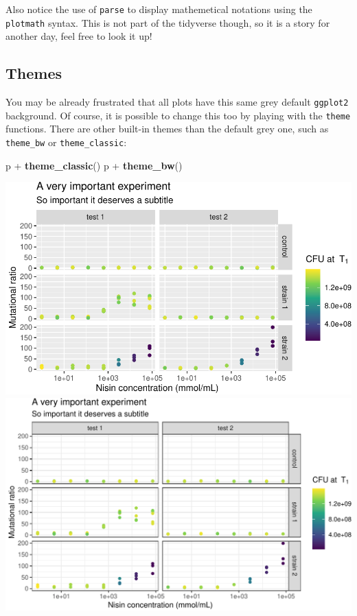 \documentclass[]{book}
\newenvironment{Shaded}{}{}
\newcommand{\KeywordTok}[1]{\textcolor[rgb]{0.00,0.44,0.13}{\textbf{#1}}}
\newcommand{\NormalTok}[1]{#1}
\newcommand{\OperatorTok}[1]{\textcolor[rgb]{0.40,0.40,0.40}{#1}}
\newcommand{\StringTok}[1]{\textcolor[rgb]{0.25,0.44,0.63}{#1}}
\begin{document}
Also notice the use of \texttt{parse} to display mathemetical notations using the \texttt{plotmath} syntax. This is not part of the tidyverse though, so it is a story for another day, feel free to look it up!

\hypertarget{themes}{%
\subsection{Themes}\label{themes}}

You may be already frustrated that all plots have this same grey default \texttt{ggplot2} background. Of course, it is possible to change this too by playing with the \texttt{theme} functions. There are other built-in themes than the default grey one, such as \texttt{theme\_bw} or \texttt{theme\_classic}:

\begin{Shaded}
\begin{Highlighting}[]
\NormalTok{p }\OperatorTok{+}\StringTok{ }\KeywordTok{theme_classic}\NormalTok{()}
\NormalTok{p }\OperatorTok{+}\StringTok{ }\KeywordTok{theme_bw}\NormalTok{()}
\end{Highlighting}
\end{Shaded}

\begin{center}\includegraphics[width=\textwidth]{TRES-Tidy-Tutorial_files/figure-latex/unnamed-chunk-143-1} \includegraphics[width=\textwidth]{TRES-Tidy-Tutorial_files/figure-latex/unnamed-chunk-143-2} \end{center}
\end{document}
